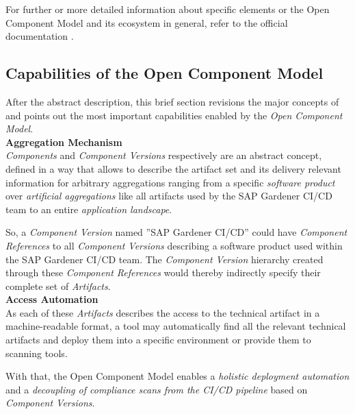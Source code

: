 For further or more detailed information about specific elements or the Open Component Model and its ecosystem in general, refer to the official documentation \cite{OCMSpec}.

\subsection{Capabilities of the Open Component Model} \label{sec:Capabilities of the Open Component Model}
After the abstract description, this brief section revisions the major concepts of and points out the most important capabilities enabled by the \emph{Open Component Model}.\\

\noindent\textbf{Aggregation Mechanism}\\
\emph{Components} and \emph{Component Versions} respectively are an abstract concept, defined in a way that allows to describe the artifact set and its delivery relevant information for arbitrary aggregations ranging from a specific \emph{software product} over \emph{artificial aggregations} like all artifacts used by the SAP Gardener CI/CD team to an entire \emph{application landscape}.\par
So, a \emph{Component Version} named ''SAP Gardener CI/CD'' could have \emph{Component References} to all \emph{Component Versions} describing a software product used within the SAP Gardener CI/CD team. The \emph{Component Version} hierarchy created through these \emph{Component References} would thereby indirectly specify their complete set of \emph{Artifacts}.\\

\noindent\textbf{Access Automation}\\
As each of these \emph{Artifacts} describes the access to the technical artifact in a machine-readable format, a tool may automatically find all the relevant technical artifacts and deploy them into a specific environment or provide them to scanning tools.\par
With that, the Open Component Model enables a \emph{holistic deployment automation} and a \emph{decoupling of compliance scans from the CI/CD pipeline} based on \emph{Component Versions}.\\ 

